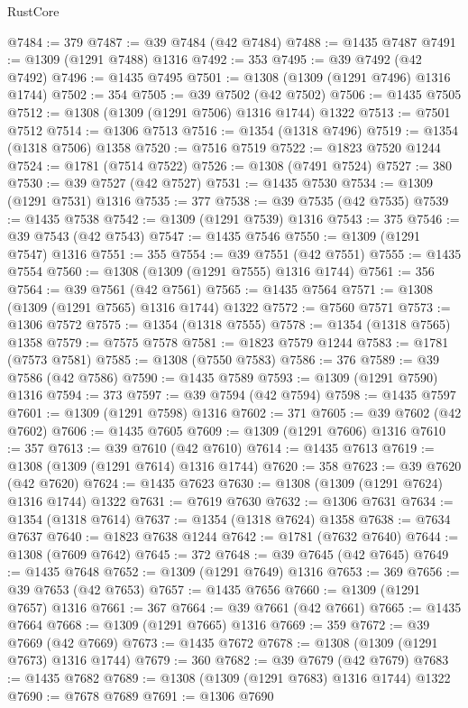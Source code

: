 \begin{lexlean}{RustCore}
\begin{coremodule}
@7484 := 379
@7487 := @39 @7484 (@42 @7484)
@7488 := @1435 @7487
@7491 := @1309 (@1291 @7488) @1316
@7492 := 353
@7495 := @39 @7492 (@42 @7492)
@7496 := @1435 @7495
@7501 := @1308 (@1309 (@1291 @7496) @1316 @1744)
@7502 := 354
@7505 := @39 @7502 (@42 @7502)
@7506 := @1435 @7505
@7512 := @1308 (@1309 (@1291 @7506) @1316 @1744) @1322
@7513 := @7501 @7512
@7514 := @1306 @7513
@7516 := @1354 (@1318 @7496)
@7519 := @1354 (@1318 @7506) @1358
@7520 := @7516 @7519
@7522 := @1823 @7520 @1244
@7524 := @1781 (@7514 @7522)
@7526 := @1308 (@7491 @7524)
@7527 := 380
@7530 := @39 @7527 (@42 @7527)
@7531 := @1435 @7530
@7534 := @1309 (@1291 @7531) @1316
@7535 := 377
@7538 := @39 @7535 (@42 @7535)
@7539 := @1435 @7538
@7542 := @1309 (@1291 @7539) @1316
@7543 := 375
@7546 := @39 @7543 (@42 @7543)
@7547 := @1435 @7546
@7550 := @1309 (@1291 @7547) @1316
@7551 := 355
@7554 := @39 @7551 (@42 @7551)
@7555 := @1435 @7554
@7560 := @1308 (@1309 (@1291 @7555) @1316 @1744)
@7561 := 356
@7564 := @39 @7561 (@42 @7561)
@7565 := @1435 @7564
@7571 := @1308 (@1309 (@1291 @7565) @1316 @1744) @1322
@7572 := @7560 @7571
@7573 := @1306 @7572
@7575 := @1354 (@1318 @7555)
@7578 := @1354 (@1318 @7565) @1358
@7579 := @7575 @7578
@7581 := @1823 @7579 @1244
@7583 := @1781 (@7573 @7581)
@7585 := @1308 (@7550 @7583)
@7586 := 376
@7589 := @39 @7586 (@42 @7586)
@7590 := @1435 @7589
@7593 := @1309 (@1291 @7590) @1316
@7594 := 373
@7597 := @39 @7594 (@42 @7594)
@7598 := @1435 @7597
@7601 := @1309 (@1291 @7598) @1316
@7602 := 371
@7605 := @39 @7602 (@42 @7602)
@7606 := @1435 @7605
@7609 := @1309 (@1291 @7606) @1316
@7610 := 357
@7613 := @39 @7610 (@42 @7610)
@7614 := @1435 @7613
@7619 := @1308 (@1309 (@1291 @7614) @1316 @1744)
@7620 := 358
@7623 := @39 @7620 (@42 @7620)
@7624 := @1435 @7623
@7630 := @1308 (@1309 (@1291 @7624) @1316 @1744) @1322
@7631 := @7619 @7630
@7632 := @1306 @7631
@7634 := @1354 (@1318 @7614)
@7637 := @1354 (@1318 @7624) @1358
@7638 := @7634 @7637
@7640 := @1823 @7638 @1244
@7642 := @1781 (@7632 @7640)
@7644 := @1308 (@7609 @7642)
@7645 := 372
@7648 := @39 @7645 (@42 @7645)
@7649 := @1435 @7648
@7652 := @1309 (@1291 @7649) @1316
@7653 := 369
@7656 := @39 @7653 (@42 @7653)
@7657 := @1435 @7656
@7660 := @1309 (@1291 @7657) @1316
@7661 := 367
@7664 := @39 @7661 (@42 @7661)
@7665 := @1435 @7664
@7668 := @1309 (@1291 @7665) @1316
@7669 := 359
@7672 := @39 @7669 (@42 @7669)
@7673 := @1435 @7672
@7678 := @1308 (@1309 (@1291 @7673) @1316 @1744)
@7679 := 360
@7682 := @39 @7679 (@42 @7679)
@7683 := @1435 @7682
@7689 := @1308 (@1309 (@1291 @7683) @1316 @1744) @1322
@7690 := @7678 @7689
@7691 := @1306 @7690

\end{coremodule}
\end{lexlean}

